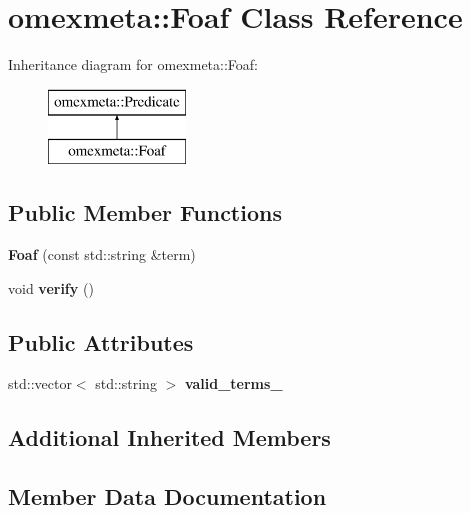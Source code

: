 \hypertarget{classomexmeta_1_1Foaf}{}\section{omexmeta\+:\+:Foaf Class Reference}
\label{classomexmeta_1_1Foaf}
Inheritance diagram for omexmeta\+:\+:Foaf\+:\begin{figure}[H]
\begin{center}
\leavevmode
\includegraphics[height=2.000000cm]{classomexmeta_1_1Foaf}
\end{center}
\end{figure}
\subsection*{Public Member Functions}
\begin{DoxyCompactItemize}
\item 
\mbox{\label{classomexmeta_1_1Foaf_af60965a79363573d9df78010936e1c81}} 
{\bfseries Foaf} (const std\+::string \&term)
\item 
\mbox{\label{classomexmeta_1_1Foaf_a044d1eedbaf2be1ac6fcd160e3365a16}} 
void {\bfseries verify} ()
\end{DoxyCompactItemize}
\subsection*{Public Attributes}
\begin{DoxyCompactItemize}
\item 
std\+::vector$<$ std\+::string $>$ {\bfseries valid\+\_\+terms\+\_\+}
\end{DoxyCompactItemize}
\subsection*{Additional Inherited Members}


\subsection{Member Data Documentation}
\mbox{\label{classomexmeta_1_1Foaf_a5a91260f5319adc671c749a09ef0cf0a}} 
